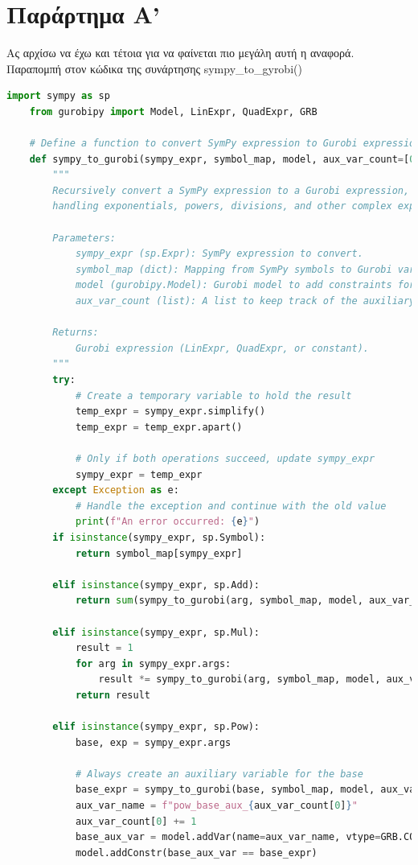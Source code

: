 \documentclass[a4paper,twoside,10pt]{article}
\begin{document}
\section*{Παράρτημα Α'}\label{firstappendix}
Ας αρχίσω να έχω και τέτοια για να φαίνεται πιο μεγάλη αυτή η αναφορά.
Παραπομπή στον κώδικα της συνάρτησης sympy\_to\_gyrobi()
\begin{lstlisting}[language=Python, caption=Python example]
	import sympy as sp
	from gurobipy import Model, LinExpr, QuadExpr, GRB
	
	# Define a function to convert SymPy expression to Gurobi expression
	def sympy_to_gurobi(sympy_expr, symbol_map, model, aux_var_count=[0]):
		"""
		Recursively convert a SymPy expression to a Gurobi expression, 
		handling exponentials, powers, divisions, and other complex expressions with auxiliary variables and constraints.
		
		Parameters:
			sympy_expr (sp.Expr): SymPy expression to convert.
			symbol_map (dict): Mapping from SymPy symbols to Gurobi variables.
			model (gurobipy.Model): Gurobi model to add constraints for complex expressions.
			aux_var_count (list): A list to keep track of the auxiliary variable count.
			
		Returns:
			Gurobi expression (LinExpr, QuadExpr, or constant).
		"""
		try:
			# Create a temporary variable to hold the result
			temp_expr = sympy_expr.simplify()
			temp_expr = temp_expr.apart()
			
			# Only if both operations succeed, update sympy_expr
			sympy_expr = temp_expr
		except Exception as e:
			# Handle the exception and continue with the old value
			print(f"An error occurred: {e}")
		if isinstance(sympy_expr, sp.Symbol):
			return symbol_map[sympy_expr]
		
		elif isinstance(sympy_expr, sp.Add):
			return sum(sympy_to_gurobi(arg, symbol_map, model, aux_var_count) for arg in sympy_expr.args)
		
		elif isinstance(sympy_expr, sp.Mul):
			result = 1
			for arg in sympy_expr.args:
				result *= sympy_to_gurobi(arg, symbol_map, model, aux_var_count)
			return result
		
		elif isinstance(sympy_expr, sp.Pow):
			base, exp = sympy_expr.args
			
			# Always create an auxiliary variable for the base
			base_expr = sympy_to_gurobi(base, symbol_map, model, aux_var_count)
			aux_var_name = f"pow_base_aux_{aux_var_count[0]}"
			aux_var_count[0] += 1
			base_aux_var = model.addVar(name=aux_var_name, vtype=GRB.CONTINUOUS)
			model.addConstr(base_aux_var == base_expr)
			

\end{lstlisting}
\end{document}
